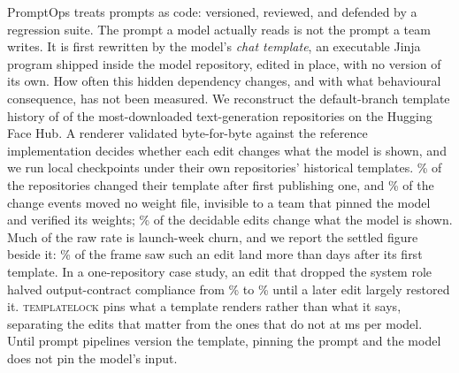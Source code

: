 PromptOps treats prompts as code: versioned, reviewed, and defended by a regression suite. The
prompt a model actually reads is not the prompt a team writes. It is first rewritten by the model's
\emph{chat template}, an executable Jinja program shipped inside the model repository, edited in
place, with no version of its own. How often this hidden dependency changes, and with what
behavioural consequence, has not been measured. We reconstruct the default-branch template history
of \NFrame{} of the most-downloaded text-generation repositories on the Hugging Face Hub. A
renderer validated byte-for-byte against the reference implementation decides whether each edit
changes what the model is shown, and we run \NCheckpoints{} local checkpoints under their own
repositories' historical templates. \PctDrifted\% of the repositories changed their template after
first publishing one, and \PctEventsWeightSilent\% of the change events moved no weight file,
invisible to a team that pinned the model and verified its weights; \PctEventsBeh\% of the
decidable edits change what the model is shown. Much of the raw rate is launch-week churn, and we
report the settled figure beside it: \PctBehSettledFrame\% of the frame saw such an edit land more
than \SettledDays{} days after its first template. In a one-repository case study, an
edit that dropped the system role halved output-contract compliance from \ConPhiA\% to \ConPhiB\%
until a later edit largely restored it. \textsc{templatelock} pins what a template renders rather than
what it says, separating the edits that matter from the ones that do not at \CostComputeMs{} ms per
model. Until prompt pipelines version the template, pinning the prompt and the model does not pin
the model's input.
